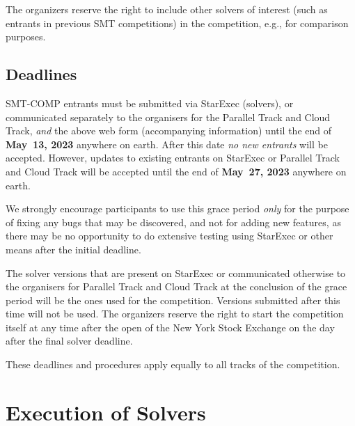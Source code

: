 \documentclass[12pt]{article}
\newcommand{\paralleltrack}{Parallel Track\xspace}
\newcommand{\cloudtrack}{Cloud Track\xspace}
\begin{document}
%
The organizers reserve the right to include other solvers of interest
(such as entrants in previous SMT competitions) in the competition,
e.g., for comparison purposes.

%


\subsection*{Deadlines}

SMT-COMP entrants must be submitted via StarExec (solvers), or
communicated separately to the organisers for the \paralleltrack{} and
\cloudtrack{}, \emph{and}
the above web form (accompanying information) until the end of
{\bf May~13, 2023} anywhere on earth.
After this date \emph{no new entrants} will be accepted.
However, updates to existing entrants on StarExec or \paralleltrack{}
and \cloudtrack{}
will be accepted until the end of {\bf May~27, 2023} anywhere on earth.

We strongly encourage participants to use this grace period
\emph{only} for the purpose of fixing any bugs that may be discovered,
and not for adding new features, as there may be no opportunity to do
extensive testing using StarExec or other means after the initial deadline.

The solver versions that are present on StarExec or communicated
otherwise to the organisers for \paralleltrack{} and \cloudtrack{} at the conclusion of
the grace period will be the ones used for the competition.  Versions
submitted after this time will not be used.  The organizers reserve
the right to start the competition itself at any time after the open
of the New York Stock Exchange on the day after the final solver
deadline.

These deadlines and procedures apply equally to all tracks of the
competition.




\section{Execution of Solvers}
\end{document}
